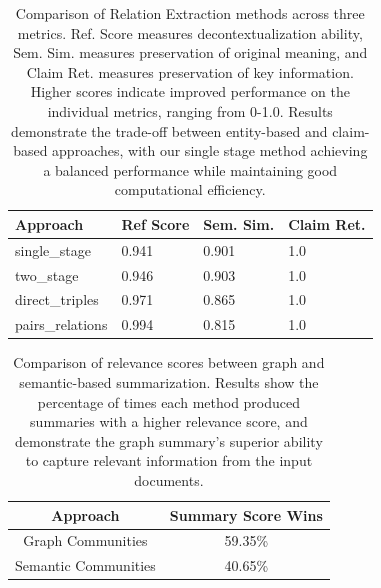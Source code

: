 \documentclass[11pt]{article}
\theoremstyle{definition}
\begin{document}
\begin{table}[h]
\begin{center}
    \begin{tabular}{p{2.1cm}|p{1.5cm}|p{1.5cm}|p{1.1cm}}
    \hline
     Approach & Ref Score & Sem. Sim. & Claim Ret. \\
     \hline
     single\_stage & 0.941 & 0.901 & 1.0 \\
     two\_stage & 0.946 & 0.903 & 1.0 \\
     direct\_triples & 0.971 & 0.865 & 1.0 \\
     pairs\_relations & 0.994 & 0.815 & 1.0 \\
     \hline
\end{tabular}
\end{center}
\caption{Comparison of Relation Extraction methods across three metrics. Ref. Score measures decontextualization ability, Sem. Sim. measures preservation of original meaning, and Claim Ret. measures preservation of key information. Higher scores indicate improved performance on the individual metrics, ranging from 0-1.0. Results demonstrate the trade-off between entity-based and claim-based approaches, with our single stage method achieving a balanced performance while maintaining good computational efficiency.  }
\label{table:Rel}
\end{table}

\begin{table}[ht]
\begin{center}
    \begin{tabular}{c|c}
    \hline
     Approach & Summary Score Wins \\
     \hline
     Graph Communities & 59.35\% \\
     Semantic Communities & 40.65\% \\
     \hline
    \end{tabular}
\end{center}
\caption{Comparison of relevance scores between graph and semantic-based summarization. Results show the percentage of times each method produced summaries with a higher relevance score, and demonstrate the graph summary's superior ability to capture relevant information from the input documents. }
\label{table:GraphCrea}
\end{table}
\end{document}
